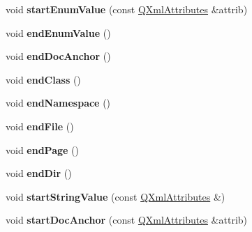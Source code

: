 \begin{DoxyCompactItemize}
\item 
\hypertarget{class_tag_file_parser_a66d8cf46d4c2a79dc2bfd75e3f2e8f14}{void {\bfseries start\-Enum\-Value} (const \hyperlink{class_q_xml_attributes}{Q\-Xml\-Attributes} \&attrib)}\label{class_tag_file_parser_a66d8cf46d4c2a79dc2bfd75e3f2e8f14}

\item 
\hypertarget{class_tag_file_parser_a47de2d8bb3dbe07bd1d0d161e9464418}{void {\bfseries end\-Enum\-Value} ()}\label{class_tag_file_parser_a47de2d8bb3dbe07bd1d0d161e9464418}

\item 
\hypertarget{class_tag_file_parser_af7b0e52b9c855ab762c29fe2f663dcd8}{void {\bfseries end\-Doc\-Anchor} ()}\label{class_tag_file_parser_af7b0e52b9c855ab762c29fe2f663dcd8}

\item 
\hypertarget{class_tag_file_parser_a20c59e445095d01be3716c04bfadb73a}{void {\bfseries end\-Class} ()}\label{class_tag_file_parser_a20c59e445095d01be3716c04bfadb73a}

\item 
\hypertarget{class_tag_file_parser_a911c2a5aab798e0531c2a5757f90a88c}{void {\bfseries end\-Namespace} ()}\label{class_tag_file_parser_a911c2a5aab798e0531c2a5757f90a88c}

\item 
\hypertarget{class_tag_file_parser_a91124168a972dfb54e63eb80980bd7c4}{void {\bfseries end\-File} ()}\label{class_tag_file_parser_a91124168a972dfb54e63eb80980bd7c4}

\item 
\hypertarget{class_tag_file_parser_a2c3ac2e9b29aeaedd26915369f26ddf5}{void {\bfseries end\-Page} ()}\label{class_tag_file_parser_a2c3ac2e9b29aeaedd26915369f26ddf5}

\item 
\hypertarget{class_tag_file_parser_a1d181e53b96ae159fb7c1ae7284ccf1b}{void {\bfseries end\-Dir} ()}\label{class_tag_file_parser_a1d181e53b96ae159fb7c1ae7284ccf1b}

\item 
\hypertarget{class_tag_file_parser_a50006ad355ab46f52ce53bdf1d8d8e68}{void {\bfseries start\-String\-Value} (const \hyperlink{class_q_xml_attributes}{Q\-Xml\-Attributes} \&)}\label{class_tag_file_parser_a50006ad355ab46f52ce53bdf1d8d8e68}

\item 
\hypertarget{class_tag_file_parser_a386a05a3f50734e6f458e54162f466cd}{void {\bfseries start\-Doc\-Anchor} (const \hyperlink{class_q_xml_attributes}{Q\-Xml\-Attributes} \&attrib)}\label{class_tag_file_parser_a386a05a3f50734e6f458e54162f466cd}


\end{DoxyCompactItemize}
